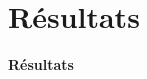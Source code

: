 \documentclass[aspectratio=169]{beamer}
\newcommand{\scite}[1]{{\normalfont\color{SpaceCyan!60!black}[\citealp{#1}]}}
\newcommand{\SectionTransitionFrame}[1]{%
  \begin{frame}[plain]
    \centering
    \vfill
    {\Huge\bfseries #1\par}
    \vfill
  \end{frame}
}
\begin{document}


\section{Résultats}

\SectionTransitionFrame{Résultats}


\end{document}
